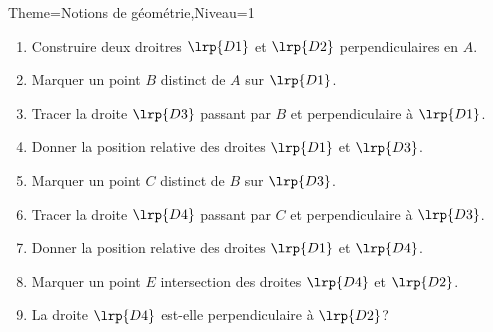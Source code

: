 \documentclass[a4paper,12pt]{article}
\begin{document}
\begin{Maquette}[Fiche]{Theme=Notions de géométrie,Niveau=1}
\begin{exercice}
\begin{enumerate}
\item Construire deux droitres $\lrp{D1}$ et $\lrp{D2}$ perpendiculaires en $A$.
\item Marquer un point $B$ distinct de $A$ sur $\lrp{D1}$.
\item Tracer la droite $\lrp{D3}$ passant par $B$ et perpendiculaire à $\lrp{D1}$.
\item Donner la position relative des droites $\lrp{D1}$ et $\lrp{D3}$.
\item Marquer un point $C$ distinct de $B$ sur $\lrp{D3}$.
\item Tracer la droite $\lrp{D4}$ passant par $C$ et perpendiculaire à $\lrp{D3}$.
\item Donner la position relative des droites $\lrp{D1}$ et $\lrp{D4}$.
\item Marquer un point $E$ intersection des droites $\lrp{D4}$ et $\lrp{D2}$.
\item La droite $\lrp{D4}$ est-elle perpendiculaire à $\lrp{D2}$?
\end{enumerate}
\end{exercice}








\end{Maquette}
\end{document}
